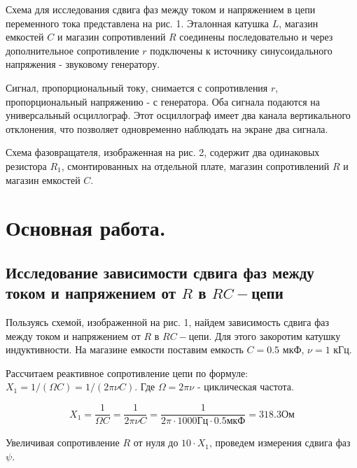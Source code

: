 \documentclass[12pt,a4paper]{article}
\begin{document}
        Схема для исследования сдвига фаз между током и напряжением в цепи переменного тока представлена на рис. 1. Эталонная катушка $L$, магазин емкостей $C$ и магазин сопротивлений $R$ соединены последовательно и через дополнительное сопротивление $r$ подключены к источнику синусоидального напряжения - звуковому генератору.
        
        Сигнал, пропорциональный току, снимается с сопротивления $r$, пропорциональный напряжению - с генератора. Оба сигнала подаются на универсальный осциллограф. Этот осциллограф имеет два канала вертикального отклонения, что позволяет одновременно наблюдать на экране два сигнала.
        
        Схема фазовращателя, изображенная на рис. 2, содержит два одинаковых резистора $R_1$, смонтированных на отдельной плате, магазин сопротивлений $R$ и магазин емкостей $C$.

\newpage
\section{Основная работа.}
    \subsection{Исследование зависимости сдвига фаз между током и напряжением от $R$ в $RC-$цепи}
        Пользуясь схемой, изображенной на рис. 1, найдем зависимость сдвига фаз между током и напряжением от $R$ в $RC-$цепи. Для этого закоротим катушку индуктивности. На магазине емкости поставим емкость $C = 0.5$ мкФ, $\nu = 1$ кГц.
        
        Рассчитаем реактивное сопротивление цепи по формуле: $X_1 = 1/(\Omega C) = 1/(2 \pi \nu C)$. Где $\Omega = 2 \pi \nu$ - циклическая частота.
        
        \[
        X_1 = \frac{1}{\Omega C} = \frac{1}{2 \pi \nu C} = \frac{1}{2 \pi \cdot 1000 \text{Гц} \cdot 0.5 \text{мкФ}} = 318.3 \text{Ом}
        \]
        
        Увеличивая сопротивление $R$ от нуля до $10 \cdot X_1$, проведем измерения сдвига фаз $\psi$.
        
\end{document}
